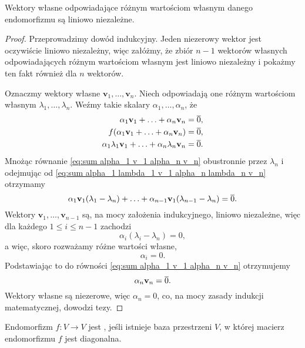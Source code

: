 \begin{lemma}
    \label{l:eigenvectors are linearly independent}
    Wektory własne odpowiadające różnym wartościom własnym danego endomorfizmu są liniowo niezależne.
\end{lemma}
\begin{proof}
    Przeprowadzimy dowód indukcyjny. Jeden niezerowy wektor jest oczywiście liniowo niezależny, więc załóżmy, że zbiór $n-1$ wektorów własnych odpowiadających różnym wartościom własnym jest liniowo niezależny i pokażmy ten fakt również dla $n$ wektorów.

    Oznaczmy wektory własne $\mathbf{v}_1, \ldots, \mathbf{v}_n$. Niech odpowiadają one różnym wartościom własnym $\lambda_1, \ldots, \lambda_n$. Weźmy takie skalary $\alpha_1, \ldots, \alpha_n$, że
    \begin{align}
        \alpha_1\mathbf{v}_1 + \ldots + \alpha_n\mathbf{v}_n &= \overline{0},
            \label{eq:sum alpha_1 v_1 alpha_n v_n} \\
        f(\alpha_1\mathbf{v}_1 + \ldots + \alpha_n\mathbf{v}_n) &= \overline{0}, \nonumber \\
        \alpha_1\lambda_1\mathbf{v}_1 + \ldots + \alpha_n\lambda_n\mathbf{v}_n &= \overline{0}.
            \label{eq:sum alpha_1 lambda_1 v_1 alpha_n lambda_n v_n}
    \end{align}
    Mnożąc równanie \ref{eq:sum alpha_1 v_1 alpha_n v_n} obustronnie przez $\lambda_n$ i odejmując od \ref{eq:sum alpha_1 lambda_1 v_1 alpha_n lambda_n v_n} otrzymamy
    \[ \alpha_1\mathbf{v}_1(\lambda_1 - \lambda_n) + \ldots + \alpha_{n-1}\mathbf{v}_1(\lambda_{n-1} - \lambda_n) = \overline{0}. \]
    Wektory $\mathbf{v}_1, \ldots, \mathbf{v}_{n-1}$ są, na mocy założenia indukcyjnego, liniowo niezależne, więc dla każdego $1 \leq i \leq n-1$ zachodzi
    \[ \alpha_i(\lambda_i - \lambda_n) = 0, \]
    a więc, skoro rozważamy różne wartości własne,
    \[ \alpha_i = 0. \]
    Podstawiając to do równości \ref{eq:sum alpha_1 v_1 alpha_n v_n} otrzymujemy
    \[ \alpha_n\mathbf{v}_n = \overline{0}. \]
    Wektory własne są niezerowe, więc $\alpha_n = 0$, co, na mocy zasady indukcji matematycznej, dowodzi tezy.
\end{proof}

\begin{definition}
    Endomorfizm $f : V \to V$ jest , jeśli istnieje baza przestrzeni $V$, w której macierz endomorfizmu $f$ jest diagonalna.
\end{definition}

